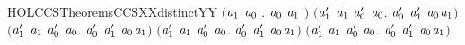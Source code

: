 \begin{SaveVerbatim}{HOLCCSTheoremsCCSXXdistinctYY}
   \ensuremath{(}\HOLSymConst{\HOLTokenForall{}}\ensuremath{\HOLBoundVar{a}\sb{\mathrm{1}}} \ensuremath{\HOLBoundVar{a}\sb{\mathrm{0}}} .  \ensuremath{\HOLBoundVar{a}\sb{\mathrm{0}}} \ensuremath{\HOLBoundVar{a}\sb{\mathrm{1}}} \HOLSymConst{\HOLTokenNotEqual{}}  \ensuremath{)} \HOLSymConst{\HOLTokenConj{}}
   \ensuremath{(}\HOLSymConst{\HOLTokenForall{}}\ensuremath{\HOLBoundVar{a}\sb{\mathrm{1}}\sp{\prime}} \ensuremath{\HOLBoundVar{a}\sb{\mathrm{1}}} \ensuremath{\HOLBoundVar{a}\sb{\mathrm{0}}\sp{\prime}} \ensuremath{\HOLBoundVar{a}\sb{\mathrm{0}}}. \ensuremath{\HOLBoundVar{a}\sb{\mathrm{0}}\sp{\prime}} \HOLSymConst{\ensuremath{+}} \ensuremath{\HOLBoundVar{a}\sb{\mathrm{1}}\sp{\prime}} \HOLSymConst{\HOLTokenNotEqual{}} \ensuremath{\HOLBoundVar{a}\sb{\mathrm{0}}}\HOLSymConst{\ensuremath{\ldotp}}\ensuremath{\HOLBoundVar{a}\sb{\mathrm{1}}}\ensuremath{)} \HOLSymConst{\HOLTokenConj{}}
   \ensuremath{(}\HOLSymConst{\HOLTokenForall{}}\ensuremath{\HOLBoundVar{a}\sb{\mathrm{1}}\sp{\prime}} \ensuremath{\HOLBoundVar{a}\sb{\mathrm{1}}} \ensuremath{\HOLBoundVar{a}\sb{\mathrm{0}}\sp{\prime}} \ensuremath{\HOLBoundVar{a}\sb{\mathrm{0}}}. \ensuremath{\HOLBoundVar{a}\sb{\mathrm{0}}\sp{\prime}} \HOLSymConst{\ensuremath{\mid}} \ensuremath{\HOLBoundVar{a}\sb{\mathrm{1}}\sp{\prime}} \HOLSymConst{\HOLTokenNotEqual{}} \ensuremath{\HOLBoundVar{a}\sb{\mathrm{0}}}\HOLSymConst{\ensuremath{\ldotp}}\ensuremath{\HOLBoundVar{a}\sb{\mathrm{1}}}\ensuremath{)} \HOLSymConst{\HOLTokenConj{}}
   \ensuremath{(}\HOLSymConst{\HOLTokenForall{}}\ensuremath{\HOLBoundVar{a}\sb{\mathrm{1}}\sp{\prime}} \ensuremath{\HOLBoundVar{a}\sb{\mathrm{1}}} \ensuremath{\HOLBoundVar{a}\sb{\mathrm{0}}\sp{\prime}} \ensuremath{\HOLBoundVar{a}\sb{\mathrm{0}}}.  \ensuremath{\HOLBoundVar{a}\sb{\mathrm{0}}\sp{\prime}} \ensuremath{\HOLBoundVar{a}\sb{\mathrm{1}}\sp{\prime}} \HOLSymConst{\HOLTokenNotEqual{}} \ensuremath{\HOLBoundVar{a}\sb{\mathrm{0}}}\HOLSymConst{\ensuremath{\ldotp}}\ensuremath{\HOLBoundVar{a}\sb{\mathrm{1}}}\ensuremath{)} \HOLSymConst{\HOLTokenConj{}}
   \ensuremath{(}\HOLSymConst{\HOLTokenForall{}}\ensuremath{\HOLBoundVar{a}\sb{\mathrm{1}}\sp{\prime}} \ensuremath{\HOLBoundVar{a}\sb{\mathrm{1}}} \ensuremath{\HOLBoundVar{a}\sb{\mathrm{0}}\sp{\prime}} \ensuremath{\HOLBoundVar{a}\sb{\mathrm{0}}}.  \ensuremath{\HOLBoundVar{a}\sb{\mathrm{0}}\sp{\prime}} \ensuremath{\HOLBoundVar{a}\sb{\mathrm{1}}\sp{\prime}} \HOLSymConst{\HOLTokenNotEqual{}} \ensuremath{\HOLBoundVar{a}\sb{\mathrm{0}}}\HOLSymConst{\ensuremath{\ldotp}}\ensuremath{\HOLBoundVar{a}\sb{\mathrm{1}}}\ensuremath{)} \HOLSymConst{\HOLTokenConj{}}

\end{SaveVerbatim}
